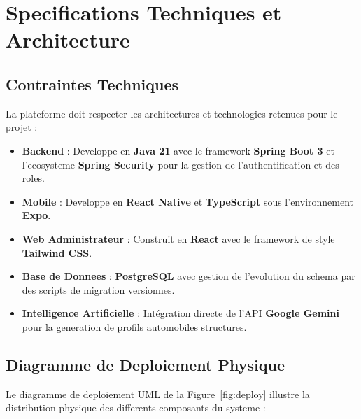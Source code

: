 \documentclass[11pt,a4paper]{report}
\begin{document}
\chapter{Specifications Techniques et Architecture}

\section{Contraintes Techniques}
La plateforme doit respecter les architectures et technologies retenues pour le projet :
\begin{itemize}[label=\textbullet]
    \item \textbf{Backend} : Developpe en \textbf{Java 21} avec le framework \textbf{Spring Boot 3} et l'ecosysteme \textbf{Spring Security} pour la gestion de l'authentification et des roles.
    \item \textbf{Mobile} : Developpe en \textbf{React Native} et \textbf{TypeScript} sous l'environnement \textbf{Expo}.
    \item \textbf{Web Administrateur} : Construit en \textbf{React} avec le framework de style \textbf{Tailwind CSS}.
    \item \textbf{Base de Donnees} : \textbf{PostgreSQL} avec gestion de l'evolution du schema par des scripts de migration versionnes.
    \item \textbf{Intelligence Artificielle} : Int\'egration directe de l'API \textbf{Google Gemini} pour la generation de profils automobiles structures.
\end{itemize}

\section{Diagramme de Deploiement Physique}
Le diagramme de deploiement UML de la Figure~\ref{fig:deploy} illustre la distribution physique des differents composants du systeme :
\end{document}
